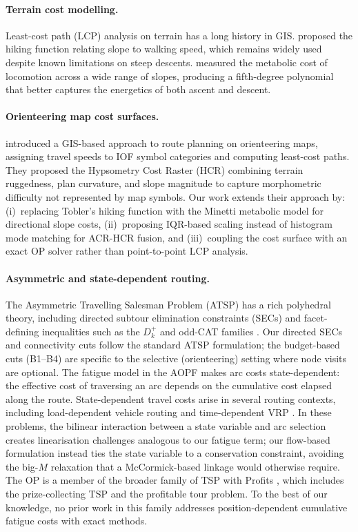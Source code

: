 \documentclass[11pt,a4paper]{article}
\begin{document}
\paragraph{Terrain cost modelling.}
Least-cost path (LCP) analysis on terrain has a long history in GIS.
\citet{tobler1993} proposed the hiking function relating slope to walking speed, which remains widely used despite known limitations on steep descents.
\citet{minetti2002} measured the metabolic cost of locomotion across a wide range of slopes, producing a fifth-degree polynomial that better captures the energetics of both ascent and descent.

\paragraph{Orienteering map cost surfaces.}
\citet{ica2021lcp} introduced a GIS-based approach to route planning on orienteering maps, assigning travel speeds to IOF symbol categories and computing least-cost paths.
They proposed the Hypsometry Cost Raster (HCR) combining terrain ruggedness, plan curvature, and slope magnitude to capture morphometric difficulty not represented by map symbols.
Our work extends their approach by: (i)~replacing Tobler's hiking function with the Minetti metabolic model for directional slope costs, (ii)~proposing IQR-based scaling instead of histogram mode matching for ACR-HCR fusion, and (iii)~coupling the cost surface with an exact OP solver rather than point-to-point LCP analysis.

\paragraph{Asymmetric and state-dependent routing.}
The Asymmetric Travelling Salesman Problem (ATSP) has a rich polyhedral theory, including directed subtour elimination constraints (SECs) and facet-defining inequalities such as the $D_k^+$ and odd-CAT families \citep{fischetti1991atsp,fischetti1997atsp}.
Our directed SECs and connectivity cuts follow the standard ATSP formulation; the budget-based cuts (B1--B4) are specific to the selective (orienteering) setting where node visits are optional.
The fatigue model in the AOPF makes arc costs state-dependent: the effective cost of traversing an arc depends on the cumulative cost elapsed along the route.
State-dependent travel costs arise in several routing contexts, including load-dependent vehicle routing \citep{bektas2011pollution} and time-dependent VRP \citep{malandraki1992timedep}.
In these problems, the bilinear interaction between a state variable and arc selection creates linearisation challenges analogous to our fatigue term; our flow-based formulation instead ties the state variable to a conservation constraint, avoiding the big-$M$ relaxation that a McCormick-based linkage would otherwise require.
The OP is a member of the broader family of TSP with Profits \citep{feillet2005tsp_profits}, which includes the prize-collecting TSP and the profitable tour problem.
To the best of our knowledge, no prior work in this family addresses position-dependent cumulative fatigue costs with exact methods.
\end{document}

